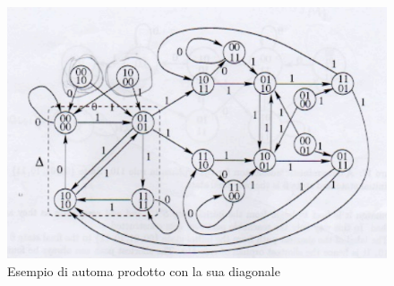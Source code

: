 \begin{figure}[!h]
    \centering
    \includegraphics[width=.7\textwidth]{img/sistemi_complessi/automa_prodotto.png}
    \caption{Esempio di automa prodotto con la sua diagonale}
    \label{fig:automa_prodotto}
\end{figure}

